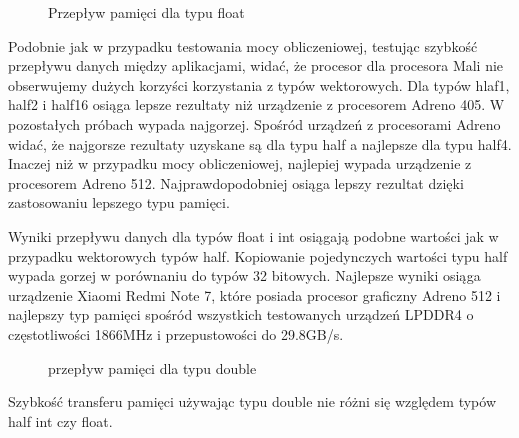 \begin{figure}[H]
\caption{Przepływ pamięci dla typu float}
\end{figure}
Podobnie jak w przypadku testowania mocy obliczeniowej, testując szybkość przepływu danych między aplikacjami, widać, że procesor dla procesora Mali nie obserwujemy dużych korzyści korzystania z typów wektorowych. Dla typów hlaf1, half2 i half16 osiąga lepsze rezultaty niż urządzenie z procesorem Adreno 405. W pozostałych próbach wypada najgorzej. Spośród urządzeń z procesorami Adreno widać, że najgorsze rezultaty uzyskane są dla typu half a najlepsze dla typu half4. Inaczej niż w przypadku mocy obliczeniowej, najlepiej wypada urządzenie z procesorem Adreno 512. Najprawdopodobniej osiąga lepszy rezultat dzięki zastosowaniu lepszego typu pamięci.

Wyniki przepływu danych dla typów float i int osiągają podobne wartości jak w przypadku wektorowych typów half. Kopiowanie pojedynczych wartości typu half wypada gorzej w porównaniu do typów 32 bitowych. Najlepsze wyniki osiąga urządzenie Xiaomi Redmi Note 7, które posiada procesor graficzny Adreno 512 i najlepszy typ pamięci spośród wszystkich testowanych urządzeń LPDDR4 o częstotliwości 1866MHz i przepu­stowości do 29.8GB/s.
\begin{figure}[H]
\caption{przepływ pamięci dla typu double}
\end{figure}
Szybkość transferu pamięci używając typu double nie różni się względem typów half int czy float.
